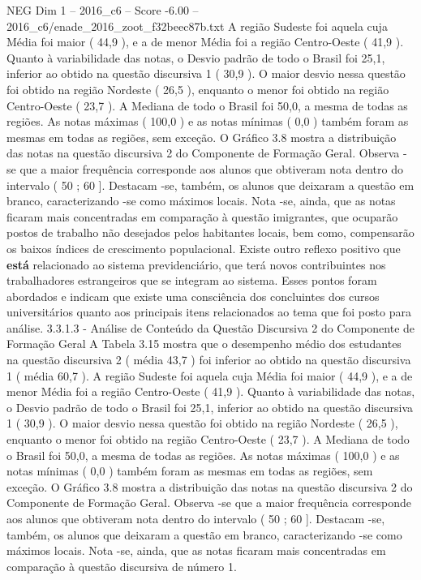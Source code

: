 \begin{textsample}{NEG Dim 1 – 2016\_c6 – Score -6.00 – 2016\_c6/enade\_2016\_zoot\_f32beec87b.txt}
A região Sudeste foi aquela cuja Média foi maior ( 44,9 ), e a de menor Média foi a região Centro-Oeste ( 41,9 ).
Quanto à variabilidade das notas, o Desvio padrão de todo o Brasil foi 25,1, inferior ao obtido na questão discursiva 1 ( 30,9 ).
O maior desvio nessa questão foi obtido na região Nordeste ( 26,5 ), enquanto o menor foi obtido na região Centro-Oeste ( 23,7 ).
A Mediana de todo o Brasil foi 50,0, a mesma de todas as regiões.
As notas máximas ( 100,0 ) e as notas mínimas ( 0,0 ) também foram as mesmas em todas as regiões, sem exceção.
O Gráfico 3.8 mostra a distribuição das notas na questão discursiva 2 do Componente de Formação Geral.
Observa -se que a maior frequência corresponde aos alunos que obtiveram nota dentro do intervalo ( 50 ; 60 ].
Destacam -se, também, os alunos que deixaram a questão em branco, caracterizando -se como máximos locais.
Nota -se, ainda, que as notas ficaram mais concentradas em comparação à questão imigrantes, que ocuparão postos de trabalho não desejados pelos habitantes locais, bem como, compensarão os baixos índices de crescimento populacional.
Existe outro reflexo positivo que \textbf{está} relacionado ao sistema previdenciário, que terá novos contribuintes nos trabalhadores estrangeiros que se integram ao sistema.
Esses pontos foram abordados e indicam que existe uma consciência dos concluintes dos cursos universitários quanto aos principais itens relacionados ao tema que foi posto para análise. 3.3.1.3 - Análise de Conteúdo da Questão Discursiva 2 do Componente de Formação Geral A Tabela 3.15 mostra que o desempenho médio dos estudantes na questão discursiva 2 ( média 43,7 ) foi inferior ao obtido na questão discursiva 1 ( média 60,7 ).
A região Sudeste foi aquela cuja Média foi maior ( 44,9 ), e a de menor Média foi a região Centro-Oeste ( 41,9 ).
Quanto à variabilidade das notas, o Desvio padrão de todo o Brasil foi 25,1, inferior ao obtido na questão discursiva 1 ( 30,9 ).
O maior desvio nessa questão foi obtido na região Nordeste ( 26,5 ), enquanto o menor foi obtido na região Centro-Oeste ( 23,7 ).
A Mediana de todo o Brasil foi 50,0, a mesma de todas as regiões.
As notas máximas ( 100,0 ) e as notas mínimas ( 0,0 ) também foram as mesmas em todas as regiões, sem exceção.
O Gráfico 3.8 mostra a distribuição das notas na questão discursiva 2 do Componente de Formação Geral.
Observa -se que a maior frequência corresponde aos alunos que obtiveram nota dentro do intervalo ( 50 ; 60 ].
Destacam -se, também, os alunos que deixaram a questão em branco, caracterizando -se como máximos locais.
Nota -se, ainda, que as notas ficaram mais concentradas em comparação à questão discursiva de número 1.

\end{textsample}
